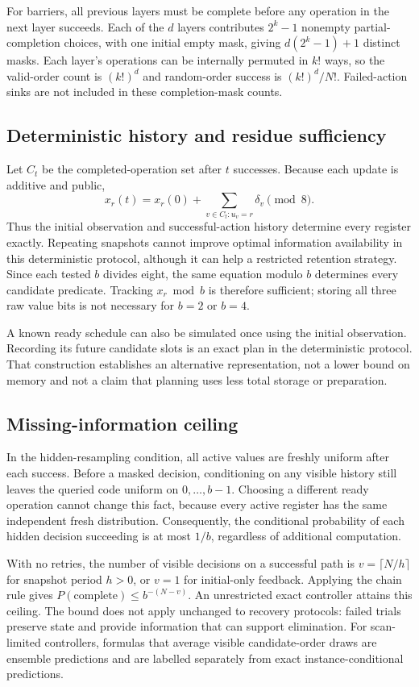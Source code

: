 For barriers, all previous layers must be complete before any operation
in the next layer succeeds. Each of the $d$ layers contributes $2^k-1$
nonempty partial-completion choices, with one initial empty mask, giving
$d(2^k-1)+1$ distinct masks. Each layer's operations can be internally
permuted in $k!$ ways, so the valid-order count is $(k!)^d$ and random-order
success is $(k!)^d/N!$. Failed-action sinks are not included in these
completion-mask counts.

\subsection{Deterministic history and residue sufficiency}
Let $C_t$ be the completed-operation set after $t$ successes. Because each
update is additive and public,
\[
 x_r(t)=x_r(0)+
 \sum_{v\in C_t:u_v=r}\delta_v \pmod8.
\]
Thus the initial observation and successful-action history determine every
register exactly. Repeating snapshots cannot improve optimal information
availability in this deterministic protocol, although it can help a
restricted retention strategy. Since each tested $b$ divides eight, the
same equation modulo $b$ determines every candidate predicate. Tracking
$x_r\bmod b$ is therefore sufficient; storing all three raw value bits
is not necessary for $b=2$ or $b=4$.

A known ready schedule can also be simulated once using the initial
observation. Recording its future candidate slots is an exact plan in the
deterministic protocol. That construction establishes an alternative
representation, not a lower bound on memory and not a claim that planning
uses less total storage or preparation.

\subsection{Missing-information ceiling}
In the hidden-resampling condition, all active values are freshly uniform
after each success. Before a masked decision, conditioning on any visible
history still leaves the queried code uniform on $0,\ldots,b-1$.
Choosing a different ready operation cannot change this fact, because every
active register has the same independent fresh distribution. Consequently,
the conditional probability of each hidden decision succeeding is at most
$1/b$, regardless of additional computation.

With no retries, the number of visible decisions on a successful path is
$v=\lceil N/h\rceil$ for snapshot period $h>0$, or $v=1$ for initial-only
feedback. Applying the chain rule gives $P(\text{complete})\le b^{-(N-v)}$.
An unrestricted exact controller attains this ceiling. The bound does not
apply unchanged to recovery protocols: failed trials preserve state and
provide information that can support elimination. For scan-limited
controllers, formulas that average visible candidate-order draws are
ensemble predictions and are labelled separately from exact
instance-conditional predictions.

